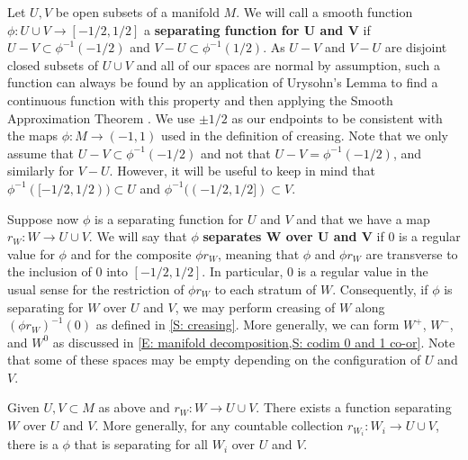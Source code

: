 \begin{definition}\label{D: separating function}
	Let $U,V$ be open subsets of a manifold $M$.
	We will call a smooth function $\phi \colon U \cup V \to [-1/2,1/2]$ a \textbf{separating function for $\mathbf U$ and $\mathbf V$} if $U - V \subset \phi^{-1}(-1/2)$ and $V - U \subset \phi^{-1}(1/2)$.
	As $U  - V$ and $V  - U$ are disjoint closed subsets of $U \cup V$ and all of our spaces are normal by assumption, such a function can always be found by an application of Urysohn's Lemma to find a continuous function with this property and then applying the Smooth Approximation Theorem \cite[Theorem III.2.5]{Kos93}.
	We use $\pm 1/2$ as our endpoints to be consistent with the maps $\phi \colon M \to (-1,1)$ used in the definition of creasing.
	Note that we only assume that $U  - V \subset \phi^{-1}(-1/2)$ and not that $U  - V = \phi^{-1}(-1/2)$, and similarly for $V  - U$.
	However, it will be useful to keep in mind that $\phi^{-1}([-1/2,1/2)) \subset U$ and $\phi^{-1}((-1/2,1/2]) \subset V$.

	Suppose now $\phi$ is a separating function for $U$ and $V$ and that we have a map $r_W \colon W \to U \cup V$.
	We will say that $\phi$ \textbf{separates $\mathbf W$ over $\mathbf U$ and $\mathbf V$} if $0$ is a regular value for $\phi$ and for the composite $\phi r_W$, meaning that $\phi$ and $\phi r_W$ are transverse to the inclusion of $0$ into $[-1/2,1/2]$.
	In particular, $0$ is a regular value in the usual sense for the restriction of $\phi r_W$ to each stratum of $W$.
	Consequently, if $\phi$ is separating for $W$ over $U$ and $V$, we may perform creasing of $W$ along $(\phi r_W)^{-1}(0)$ as defined in \cref{S: creasing}.
	More generally, we can form $W^+$, $W^-$, and $W^0$ as discussed in \cref{E: manifold decomposition,S: codim 0 and 1 co-or}.
	Note that some of these spaces may be empty depending on the configuration of $U$ and $V$.
\end{definition}

\begin{lemma}\label{L: existence of separating}
	Given $U,V \subset M$ as above and $r_W \colon W \to U \cup V$.
	There exists a function separating $W$ over $U$ and $V$.
	More generally, for any countable collection $r_{W_i} \colon W_i \to U \cup V$, there is a $\phi$ that is separating for all $W_i$ over $U$ and $V$.
\end{lemma}

